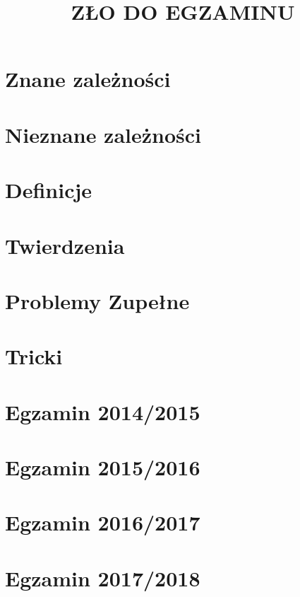 \documentclass[landscape, 9pt, twocolumn]{article}
\title{ZŁO DO EGZAMINU}
\author{}
\date{}
\begin{document}
\makeatletter
{}
\def\dontdofcolorbox{\renewcommand\fcolorbox[4][]{##4}}
\makeatother

\section{Znane zależności}




\section{Nieznane zależności}


\section{Definicje}


\section{Twierdzenia}


\section{Problemy Zupełne}


\section{Tricki}



\section{Egzamin 2014/2015}


\section{Egzamin 2015/2016}


\section{Egzamin 2016/2017}


\section{Egzamin 2017/2018}

\end{document}
